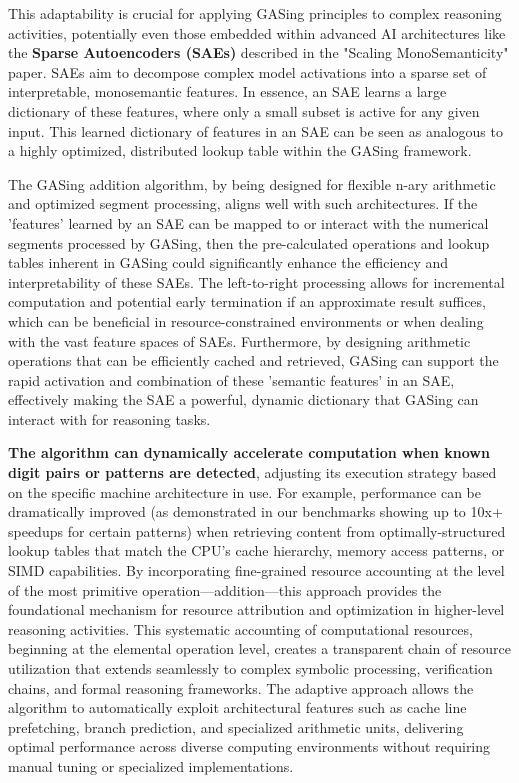 This adaptability is crucial for applying GASing principles to complex reasoning activities, potentially even those embedded within advanced AI architectures like the \textbf{Sparse Autoencoders (SAEs)} described in the "Scaling MonoSemanticity" paper. SAEs aim to decompose complex model activations into a sparse set of interpretable, monosemantic features. In essence, an SAE learns a large dictionary of these features, where only a small subset is active for any given input. This learned dictionary of features in an SAE can be seen as analogous to a highly optimized, distributed lookup table within the GASing framework. 

The GASing addition algorithm, by being designed for flexible n-ary arithmetic and optimized segment processing, aligns well with such architectures. If the 'features' learned by an SAE can be mapped to or interact with the numerical segments processed by GASing, then the pre-calculated operations and lookup tables inherent in GASing could significantly enhance the efficiency and interpretability of these SAEs. The left-to-right processing allows for incremental computation and potential early termination if an approximate result suffices, which can be beneficial in resource-constrained environments or when dealing with the vast feature spaces of SAEs. Furthermore, by designing arithmetic operations that can be efficiently cached and retrieved, GASing can support the rapid activation and combination of these 'semantic features' in an SAE, effectively making the SAE a powerful, dynamic dictionary that GASing can interact with for reasoning tasks.

\textbf{The algorithm can dynamically accelerate computation when known digit pairs or patterns are detected}, adjusting its execution strategy based on the specific machine architecture in use. For example, performance can be dramatically improved (as demonstrated in our benchmarks showing up to 10x+ speedups for certain patterns) when retrieving content from optimally-structured lookup tables that match the CPU's cache hierarchy, memory access patterns, or SIMD capabilities. By incorporating fine-grained resource accounting at the level of the most primitive operation—addition—this approach provides the foundational mechanism for resource attribution and optimization in higher-level reasoning activities. This systematic accounting of computational resources, beginning at the elemental operation level, creates a transparent chain of resource utilization that extends seamlessly to complex symbolic processing, verification chains, and formal reasoning frameworks. The adaptive approach allows the algorithm to automatically exploit architectural features such as cache line prefetching, branch prediction, and specialized arithmetic units, delivering optimal performance across diverse computing environments without requiring manual tuning or specialized implementations.


